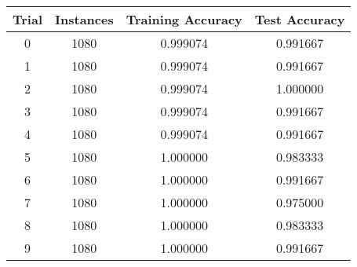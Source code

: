 {\footnotesize
\begin{tabular}{ c | c | c | c }
Trial & Instances & Training Accuracy & Test Accuracy \\
\hline
0 & 1080 & 0.999074 & 0.991667 \\
1 & 1080 & 0.999074 & 0.991667 \\
2 & 1080 & 0.999074 & 1.000000 \\
3 & 1080 & 0.999074 & 0.991667 \\
4 & 1080 & 0.999074 & 0.991667 \\
5 & 1080 & 1.000000 & 0.983333 \\
6 & 1080 & 1.000000 & 0.991667 \\
7 & 1080 & 1.000000 & 0.975000 \\
8 & 1080 & 1.000000 & 0.983333 \\
9 & 1080 & 1.000000 & 0.991667 \\
\end{tabular}
}
